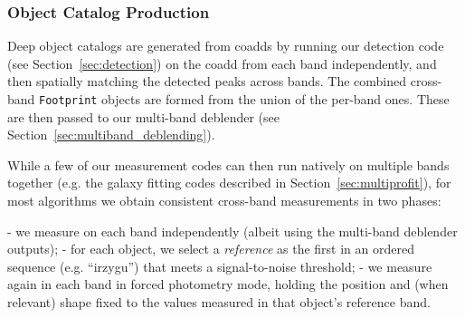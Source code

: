 \subsubsection{Object Catalog Production}

Deep object catalogs are generated from coadds by running our detection code (see Section~\ref{sec:detection}) on the coadd from each band independently, and then spatially matching the detected peaks across bands.
The combined cross-band \texttt{Footprint} objects are formed from the union of the per-band ones.
These are then passed to our multi-band deblender (see Section~\ref{sec:multiband_deblending}).

While a few of our measurement codes can then run natively on multiple bands together (e.g. the galaxy fitting codes described in Section~\ref{sec:multiprofit}), for most algorithms we obtain consistent cross-band measurements in two phases:

- we measure on each band independently (albeit using the multi-band deblender outputs);
- for each object, we select a \emph{reference} as the first in an ordered sequence (e.g. ``irzygu'') that meets a signal-to-noise threshold;
- we measure again in each band in forced photometry mode, holding the position and (when relevant) shape fixed to the values measured in that object's reference band.
